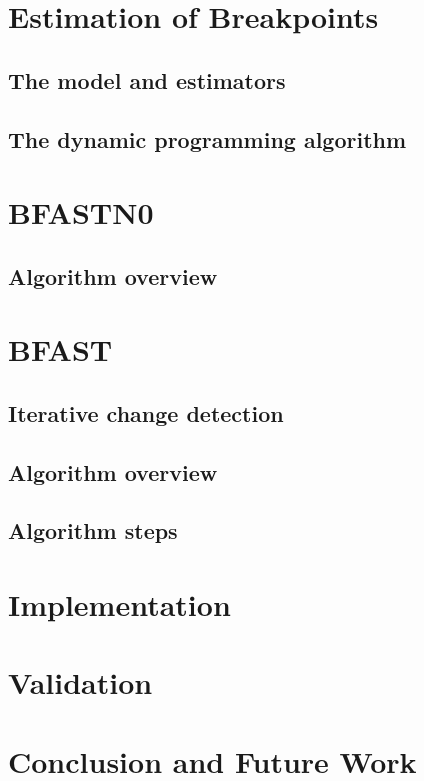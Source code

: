 \documentclass[a4paper]{article}
\begin{document}
\section{Estimation of Breakpoints}
\label{sec:estimation_of_breakpoints}
\subsection{The model and estimators}
\label{subsec:the_model_and_estimators}
\subsection{The dynamic programming algorithm}
\label{subsec:the_dynamic_programming_algorithm}

\section{BFASTN0}
\label{sec:bfast0n}
\subsection{Algorithm overview}
\label{subsec:n0_algorithm_overview}

\section{BFAST}
\label{sec:bfast}
\subsection{Iterative change detection}
\label{subsec:iterative_change_detection}
\subsection{Algorithm overview}
\label{subsec:bfast_algorithm_overview}
\subsection{Algorithm steps}
\label{subsec:algorithm_steps}

\section{Implementation}
\label{sec:implementation}

\section{Validation}
\label{sec:validation}

\section{Conclusion and Future Work}
\label{sec:conclusion_and_future_work}
\end{document}
